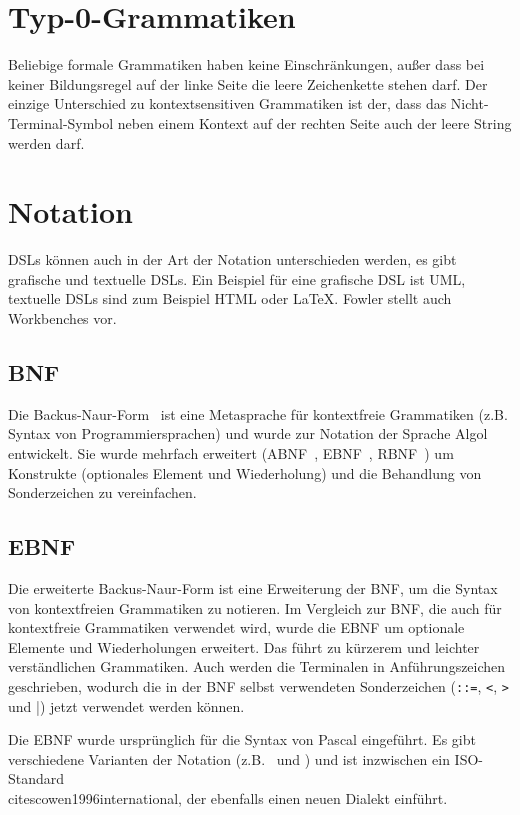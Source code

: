 \documentclass[../InterneDSLs.tex]{subfiles}
\begin{document}
\section{Typ-0-Grammatiken}\label{sec:beliebigegrammatik}
Beliebige formale Grammatiken haben keine Einschränkungen, außer dass bei keiner Bildungsregel auf der linke Seite die leere Zeichenkette stehen darf. Der einzige Unterschied zu kontextsensitiven Grammatiken ist der, dass das Nicht-Terminal-Symbol neben einem Kontext auf der rechten Seite auch der leere String werden darf.


\section{Notation}\label{SEC:Notation}
DSLs können auch in der Art der Notation unterschieden werden, es gibt grafische und textuelle DSLs. Ein Beispiel für eine grafische DSL ist UML, textuelle DSLs sind zum Beispiel HTML oder LaTeX. Fowler stellt auch Workbenches vor.\cite[S. 22ff]{Fowler.2010}

\subsection{BNF}
Die Backus-Naur-Form~\cite{bnf.wikipedia} ist eine Metasprache für kontextfreie Grammatiken (z.B. Syntax von Programmiersprachen) und wurde zur Notation der Sprache Algol entwickelt. Sie wurde mehrfach erweitert (ABNF~\cite{crocker1997augmented}, EBNF~\cite{ebnf.wikipedia}, RBNF~\cite{farrel2009routing}) um Konstrukte (optionales Element und Wiederholung) und die Behandlung von Sonderzeichen zu vereinfachen.

\subsection{EBNF}
Die erweiterte Backus-Naur-Form ist eine Erweiterung der BNF, um die Syntax von kontextfreien Grammatiken zu notieren. Im Vergleich zur BNF, die auch für kontextfreie Grammatiken verwendet wird, wurde die EBNF um optionale Elemente und Wiederholungen erweitert. Das führt zu kürzerem und leichter verständlichen Grammatiken. Auch werden die Terminalen in Anführungszeichen geschrieben, wodurch die in der BNF selbst verwendeten Sonderzeichen (\verb|::=|, \verb|<|, \verb|>| und \verb|||) jetzt verwendet werden können.

Die EBNF wurde ursprünglich für die Syntax von Pascal eingeführt. Es gibt verschiedene Varianten der Notation (z.B.~\cite{wirthsyntaxnotation.wikipedia} und \cite{ebnfnotations.jinks}) und ist inzwischen ein ISO-Standard\\cite{scowen1996international}, der ebenfalls einen neuen Dialekt einführt.
\end{document}
